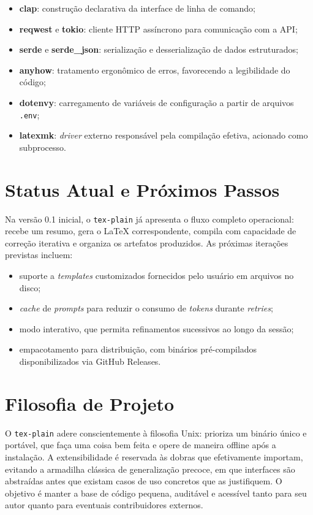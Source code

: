 \documentclass[11pt,a4paper]{article}
\begin{document}
\begin{itemize}
    \item \textbf{clap}: construção declarativa da interface de linha de comando;
    \item \textbf{reqwest} e \textbf{tokio}: cliente HTTP assíncrono para comunicação com a API;
    \item \textbf{serde} e \textbf{serde\_json}: serialização e desserialização de dados estruturados;
    \item \textbf{anyhow}: tratamento ergonômico de erros, favorecendo a legibilidade do código;
    \item \textbf{dotenvy}: carregamento de variáveis de configuração a partir de arquivos \texttt{.env};
    \item \textbf{latexmk}: \textit{driver} externo responsável pela compilação efetiva, acionado como subprocesso.
\end{itemize}

\section{Status Atual e Próximos Passos}

Na versão 0.1 inicial, o \texttt{tex-plain} já apresenta o fluxo completo operacional: recebe um resumo, gera o LaTeX correspondente, compila com capacidade de correção iterativa e organiza os artefatos produzidos. As próximas iterações previstas incluem:

\begin{itemize}
    \item suporte a \textit{templates} customizados fornecidos pelo usuário em arquivos no disco;
    \item \textit{cache} de \textit{prompts} para reduzir o consumo de \textit{tokens} durante \textit{retries};
    \item modo interativo, que permita refinamentos sucessivos ao longo da sessão;
    \item empacotamento para distribuição, com binários pré-compilados disponibilizados via GitHub Releases.
\end{itemize}

\section{Filosofia de Projeto}

O \texttt{tex-plain} adere conscientemente à filosofia Unix: prioriza um binário único e portável, que faça uma coisa bem feita e opere de maneira offline após a instalação. A extensibilidade é reservada às dobras que efetivamente importam, evitando a armadilha clássica de generalização precoce, em que interfaces são abstraídas antes que existam casos de uso concretos que as justifiquem. O objetivo é manter a base de código pequena, auditável e acessível tanto para seu autor quanto para eventuais contribuidores externos.
\end{document}

